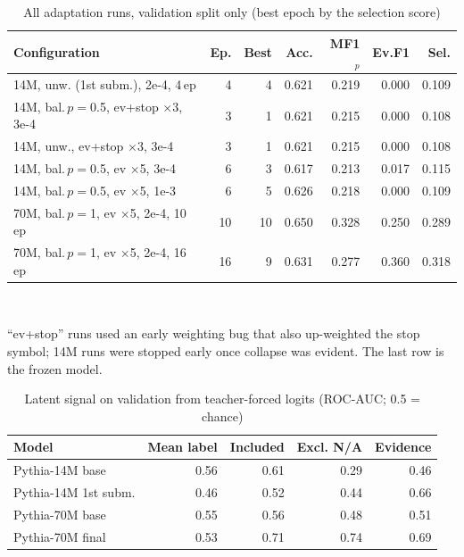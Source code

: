 \begin{table}[t]\centering\caption{All adaptation runs, validation split only (best epoch by the selection score)}\label{tab:runs}\footnotesize
\begin{tabular}{lrrrrrr}
\hline
Configuration & Ep. & Best & Acc. & MF1$_p$ & Ev.F1 & Sel.\\\hline
14M, unw. (1st subm.), 2e-4, 4\,ep & 4 & 4 & 0.621 & 0.219 & 0.000 & 0.109\\
14M, bal.\,$p{=}$0.5, ev+stop $\times$3, 3e-4 & 3 & 1 & 0.621 & 0.215 & 0.000 & 0.108\\
14M, unw., ev+stop $\times$3, 3e-4 & 3 & 1 & 0.621 & 0.215 & 0.000 & 0.108\\
14M, bal.\,$p{=}$0.5, ev $\times$5, 3e-4 & 6 & 3 & 0.617 & 0.213 & 0.017 & 0.115\\
14M, bal.\,$p{=}$0.5, ev $\times$5, 1e-3 & 6 & 5 & 0.626 & 0.218 & 0.000 & 0.109\\
70M, bal.\,$p{=}$1, ev $\times$5, 2e-4, 10\,ep & 10 & 10 & 0.650 & 0.328 & 0.250 & 0.289\\
70M, bal.\,$p{=}$1, ev $\times$5, 2e-4, 16\,ep & 16 & 9 & 0.631 & 0.277 & 0.360 & 0.318\\
\hline\end{tabular}
\\[2pt]\parbox{0.98\linewidth}{\scriptsize ``ev+stop'' runs used an early weighting bug that also up-weighted the stop symbol; 14M runs were stopped early once collapse was evident. The last row is the frozen model.}
\end{table}

\begin{table}[t]\centering\caption{Latent signal on validation from teacher-forced logits (ROC-AUC; 0.5 = chance)}\label{tab:diag}\footnotesize
\begin{tabular}{lrrrr}
\hline
Model & Mean label & Included & Excl. N/A & Evidence\\\hline
Pythia-14M base & 0.56 & 0.61 & 0.29 & 0.46\\
Pythia-14M 1st subm. & 0.46 & 0.52 & 0.44 & 0.66\\
Pythia-70M base & 0.55 & 0.56 & 0.48 & 0.51\\
Pythia-70M final & 0.53 & 0.71 & 0.74 & 0.69\\
\hline\end{tabular}
\end{table}

